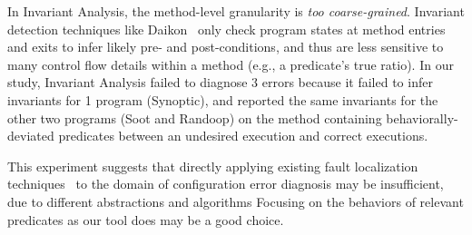 In Invariant Analysis, the method-level granularity is \textit{too coarse-grained}.
Invariant detection techniques like Daikon~\cite{Ernst:1999}
only check program states at method entries and exits to infer
likely pre- and post-conditions, and thus are less
sensitive to many control flow details within a method (e.g., a predicate's
true ratio). In our study, Invariant Analysis failed to diagnose 3
errors because it failed to infer invariants for 1 program (Synoptic),
and reported the same invariants for the other two programs (Soot and Randoop)
on the method containing behaviorally-deviated predicates between an undesired execution and correct executions.





This experiment suggests that directly applying existing fault localization
techniques~\cite{Jones:2002, McCamant:2003} to the domain of
configuration error diagnosis may be insufficient, due
to different abstractions and algorithms
Focusing on the behaviors of relevant predicates as our tool does
 may be a good choice.
